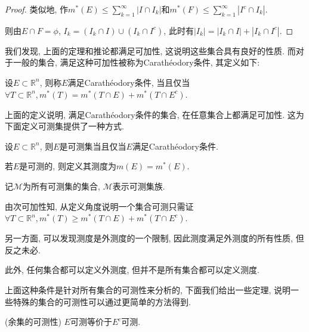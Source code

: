 \documentclass[theorem=false,mathfont=none,openany,sub3section]{easybook}
\begin{document}
\begin{proof}
  类似地, 作$m^{*}(E)\leqslant \sum_{k=1}^{\infty}|I\cap I_k|$和$m^{*}(F)\leqslant \sum_{k=1}^{\infty}|I^c\cap I_k|$.\par
  则由$E\cap F=\phi$, $I_k=(I_k\cap I)\cup (I_k\cap I^c)$, 此时有$|I_k|=|I_k\cap I|+|I_k\cap I^c|$.\par
\end{proof}

我们发现, 上面的定理和推论都满足可加性, 这说明这些集合具有良好的性质. 而对于一般的集合, 满足这种可加性被称为Carathéodory条件, 其定义如下:\par

\begin{definition}
  设$E\subset \mathbb{R}^n$, 则称$E$满足Carathéodory条件, 当且仅当$\forall T\subset \mathbb{R}^n, m^{*}(T)=m^{*}(T\cap E)+m^{*}(T\cap E^c)$.\par 
\end{definition}

\begin{remark}
  上面的定义说明, 满足Carathéodory条件的集合, 在任意集合上都满足可加性. 这为下面定义可测集提供了一种方式.\par
\end{remark}

\begin{definition}
  设$E\subset \mathbb{R}^n$, 则$E$是可测集当且仅当$E$满足Carathéodory条件.\par
  若$E$是可测的, 则定义其测度为$m(E)=m^{*}(E)$.\par
  记$\mathcal{M}$为所有可测集的集合, $\mathcal{M}$表示可测集族.\par
\end{definition}

\begin{remark}
  由次可加性知, 从定义角度说明一个集合可测只需证$\forall T\subset \mathbb{R}^n, m^{*}(T)\geqslant m^{*}(T\cap E)+m^{*}(T\cap E^c)$.\par
  另一方面, 可以发现测度是外测度的一个限制, 因此测度满足外测度的所有性质, 但反之未必.\par
  此外, 任何集合都可以定义外测度, 但并不是所有集合都可以定义测度.\par
\end{remark}

上面这种条件是针对所有集合的可测性来分析的, 下面我们给出一些定理, 说明一些特殊的集合的可测性可以通过更简单的方法得到.\par

\begin{theorem}
  (余集的可测性) $E$可测等价于$E^c$可测.\par
\end{theorem}
\end{document}
